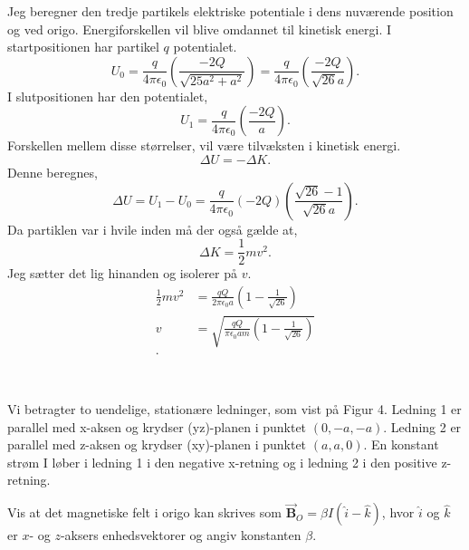 \begin{solution}
	Jeg beregner den tredje partikels elektriske potentiale i dens nuværende position og ved origo. Energiforskellen vil blive omdannet til kinetisk energi. I startpositionen har partikel $q$ potentialet.
	 \[
		 U_0 = \frac{q}{4\pi\epsilon_0}\left( \frac{-2Q}{\sqrt{25a^2 + a^2} } \right) = \frac{q}{4\pi\epsilon_0}\left( \frac{-2Q}{\sqrt{26}a } \right) 
	.\]
	I slutpositionen har den potentialet,
	\[
	U_1 = \frac{q}{4\pi\epsilon_0}\left( \frac{-2Q}{a} \right) 
	.\] 
	Forskellen mellem disse størrelser, vil være tilvæksten i kinetisk energi.
	\[
	\Delta U = -\Delta K
	.\]
	Denne beregnes,
	\[
		\Delta U = U_1 - U_0 = \frac{q}{4\pi\epsilon_0}(-2Q)\left( \frac{\sqrt{26} -1 }{\sqrt{26}a }  \right) 
	.\]
	Da partiklen var i hvile inden må der også gælde at,
	\[
	\Delta K = \frac{1}{2}mv^2
	.\] 
	Jeg sætter det lig hinanden og isolerer på $v$.
	 \begin{align*}
		 \frac{1}{2}mv^2 &= \frac{qQ}{2\pi\epsilon_0a}\left( 1 - \frac{1}{\sqrt{26} } \right) \\
		v &= \sqrt{\frac{qQ}{\pi\epsilon_0am}\left( 1 - \frac{1}{\sqrt{26} } \right) }  \\
	.\end{align*}
\end{solution}\\
\begin{exercise}[Opgave 4]
Vi betragter to uendelige, stationære ledninger, som vist på Figur 4. Ledning 1 er parallel med x-aksen og krydser (yz)-planen i punktet $(0, −a, −a)$. Ledning 2 er parallel med z-aksen og krydser (xy)-planen i punktet $(a, a, 0)$. En konstant strøm I løber i ledning 1 i den negative x-retning og i ledning 2 i den positive z-retning.
\end{exercise}
\begin{figure}[ht]
    \centering
    \label{fig:opgave4}
\end{figure}
\begin{subexercise}[a]
Vis at det magnetiske felt i origo kan skrives som $\vec{\mathbf{B}} _O = \beta I\left( \hat{i}-\hat{k} \right) $, hvor $\hat{i}$ og $\hat{k}$ er $x$- og $z$-aksers enhedsvektorer og angiv konstanten $\beta $. 
\end{subexercise}

